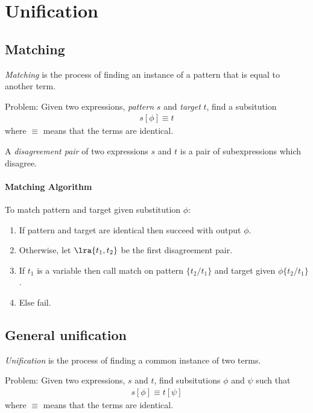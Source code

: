 \documentclass{article}
\begin{document}
\section{Unification}

\subsection{Matching}

\begin{definition}
    \emph{Matching} is the process of finding an instance of a pattern that is equal to another term.

    Problem: Given two expressions, \emph{pattern} $s$ and \emph{target} $t$, find a subsitution
    \begin{align*}
        s[\phi] \equiv t
    \end{align*}
    where $\equiv$ means that the terms are identical.
\end{definition}

\begin{definition}
    A \emph{disagreement pair} of two expressions $s$ and $t$ is a pair of subexpressions
    which disagree.
\end{definition}

\paragraph{Matching Algorithm}

To match pattern and target given substitution $\phi$:

\begin{enumerate}
    \item If pattern and target are identical then succeed with output $\phi$.
    \item Otherwise, let $\lra{t_1, t_2}$ be the first disagreement pair.
    \item If $t_1$ is a variable then call match on pattern $\{t_2/t_1\}$ and target given $\phi\{t_2/t_1\}$.
    \item Else fail.
\end{enumerate}

\subsection{General unification}

\begin{definition}
    \emph{Unification} is the process of finding a common instance of two terms.

    Problem: Given two expressions, $s$ and $t$, find subsitutions
    $\phi$ and $\psi$ such that
    \begin{align*}
        s[\phi] \equiv t[\psi]
    \end{align*}
    where $\equiv$ means that the terms are identical.
\end{definition}
\end{document}
